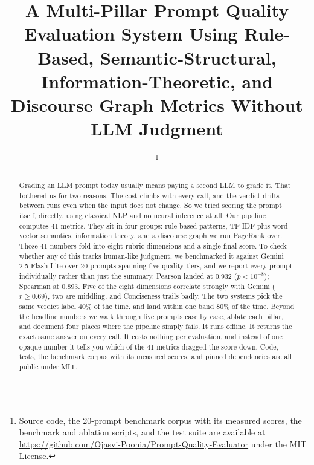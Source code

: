 \documentclass[conference]{IEEEtran}
\begin{document}
\title{A Multi-Pillar Prompt Quality Evaluation System Using Rule-Based, Semantic-Structural, Information-Theoretic, and Discourse Graph Metrics Without LLM Judgment}

\author{
\and
{}
\thanks{Source code, the 20-prompt benchmark corpus with its measured scores, the benchmark and ablation scripts, and the test suite are available at \url{https://github.com/Ojasvi-Poonia/Prompt-Quality-Evaluator} under the MIT License.}
}

\maketitle

\begin{abstract}
Grading an LLM prompt today usually means paying a second LLM to grade it. That bothered us for two reasons. The cost climbs with every call, and the verdict drifts between runs even when the input does not change. So we tried scoring the prompt itself, directly, using classical NLP and no neural inference at all. Our pipeline computes 41 metrics. They sit in four groups: rule-based patterns, TF-IDF plus word-vector semantics, information theory, and a discourse graph we run PageRank over. Those 41 numbers fold into eight rubric dimensions and a single final score. To check whether any of this tracks human-like judgment, we benchmarked it against Gemini 2.5 Flash Lite over 20 prompts spanning five quality tiers, and we report every prompt individually rather than just the summary. Pearson landed at 0.932 ($p < 10^{-8}$); Spearman at 0.893. Five of the eight dimensions correlate strongly with Gemini ($r \geq 0.69$), two are middling, and Conciseness trails badly. The two systems pick the same verdict label $40\%$ of the time, and land within one band $80\%$ of the time. Beyond the headline numbers we walk through five prompts case by case, ablate each pillar, and document four places where the pipeline simply fails. It runs offline. It returns the exact same answer on every call. It costs nothing per evaluation, and instead of one opaque number it tells you which of the 41 metrics dragged the score down. Code, tests, the benchmark corpus with its measured scores, and pinned dependencies are all public under MIT.
\end{abstract}
\end{document}
